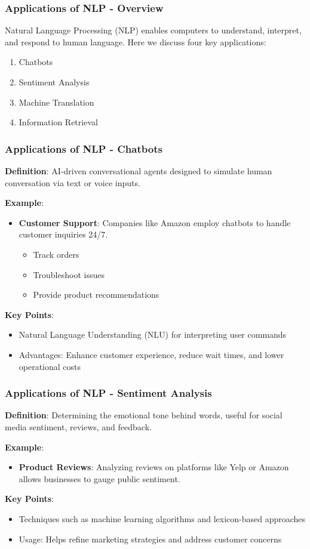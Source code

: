 \documentclass[aspectratio=169]{beamer}
\begin{document}
\begin{frame}[fragile]
    \frametitle{Applications of NLP - Overview}
    Natural Language Processing (NLP) enables computers to understand, interpret, and respond to human language. Here we discuss four key applications:
    \begin{enumerate}
        \item Chatbots
        \item Sentiment Analysis
        \item Machine Translation
        \item Information Retrieval
    \end{enumerate}
\end{frame}

\begin{frame}[fragile]
    \frametitle{Applications of NLP - Chatbots}
    \textbf{Definition}: AI-driven conversational agents designed to simulate human conversation via text or voice inputs.

    \textbf{Example}:
    \begin{itemize}
        \item \textbf{Customer Support}: Companies like Amazon employ chatbots to handle customer inquiries 24/7.
        \begin{itemize}
            \item Track orders
            \item Troubleshoot issues
            \item Provide product recommendations
        \end{itemize}
    \end{itemize}

    \textbf{Key Points}:
    \begin{itemize}
        \item Natural Language Understanding (NLU) for interpreting user commands
        \item Advantages: Enhance customer experience, reduce wait times, and lower operational costs
    \end{itemize}
\end{frame}

\begin{frame}[fragile]
    \frametitle{Applications of NLP - Sentiment Analysis}
    \textbf{Definition}: Determining the emotional tone behind words, useful for social media sentiment, reviews, and feedback.

    \textbf{Example}:
    \begin{itemize}
        \item \textbf{Product Reviews}: Analyzing reviews on platforms like Yelp or Amazon allows businesses to gauge public sentiment.
    \end{itemize}

    \textbf{Key Points}:
    \begin{itemize}
        \item Techniques such as machine learning algorithms and lexicon-based approaches
        \item Usage: Helps refine marketing strategies and address customer concerns
    \end{itemize}
\end{frame}
\end{document}
